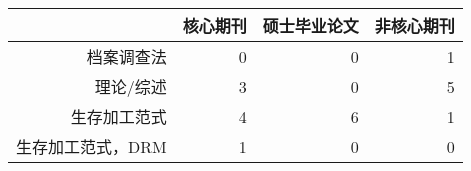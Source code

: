 \begin{table}[ht]
\centering
\begin{tabular}{rrrr}
  \hline
 & 核心期刊 & 硕士毕业论文 & 非核心期刊 \\ 
  \hline
档案调查法 &   0 &   0 &   1 \\ 
  理论/综述 &   3 &   0 &   5 \\ 
  生存加工范式 &   4 &   6 &   1 \\ 
  生存加工范式，DRM &   1 &   0 &   0 \\ 
   \hline
\end{tabular}
\end{table}
